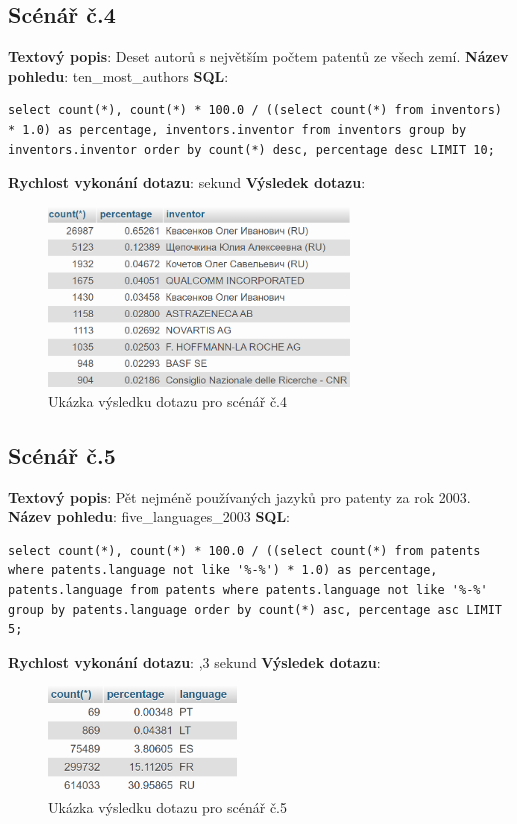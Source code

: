 \subsection{Scénář č.4} 
\textbf{Textový popis}: Deset autorů s největším počtem patentů ze všech zemí.
\newline
\textbf{Název pohledu}: ten\_most\_authors
\newline
\textbf{SQL}: 
\begin{lstlisting}[label = {lst:elements_a}]
select count(*), count(*) * 100.0 / ((select count(*) from inventors) * 1.0) as percentage, inventors.inventor from inventors group by inventors.inventor order by count(*) desc, percentage desc LIMIT 10;
\end{lstlisting}
\textbf{Rychlost vykonání dotazu}:  sekund
\newline
\textbf{Výsledek dotazu}:
\begin{figure}[H]
\centering
\includegraphics[width=8cm]{img/scenare/scenar_4}
\caption{Ukázka výsledku dotazu pro scénář č.4}
\label{fig:scenar4}
\end{figure}

\newpage
\subsection{Scénář č.5}
\textbf{Textový popis}: Pět nejméně používaných jazyků pro patenty za rok 2003.
\newline
\textbf{Název pohledu}: five\_languages\_2003
\newline
\textbf{SQL}: 
\begin{lstlisting}[label = {lst:elements_a}]
select count(*), count(*) * 100.0 / ((select count(*) from patents where patents.language not like '%-%') * 1.0) as percentage, patents.language from patents where patents.language not like '%-%' group by patents.language order by count(*) asc, percentage asc LIMIT 5;
\end{lstlisting}
\textbf{Rychlost vykonání dotazu}: ,3 sekund
\newline
\textbf{Výsledek dotazu}:
\begin{figure}[H]
\centering
\includegraphics[width=5cm]{img/scenare/scenar_5}
\caption{Ukázka výsledku dotazu pro scénář č.5}
\label{fig:scenar5}
\end{figure}

